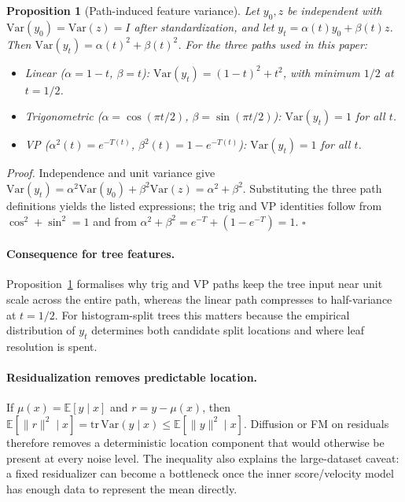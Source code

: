 \documentclass{tpm2026}
\newcommand{\E}{\mathbb{E}}
\newcommand{\Var}{\mathrm{Var}}
\newtheorem{proposition}{Proposition}
\begin{document}
\begin{proposition}[Path-induced feature variance]\label{prop:path-variance}
Let $y_0,z$ be independent with $\Var(y_0)=\Var(z)=I$ after standardization, and let $y_t=\alpha(t)y_0+\beta(t)z$. Then $\Var(y_t)=\alpha(t)^2+\beta(t)^2$. For the three paths used in this paper:
\begin{itemize}
  \item Linear ($\alpha=1-t$, $\beta=t$): $\Var(y_t)=(1-t)^2+t^2$, with minimum $1/2$ at $t=1/2$.
  \item Trigonometric ($\alpha=\cos(\pi t/2)$, $\beta=\sin(\pi t/2)$): $\Var(y_t)=1$ for all $t$.
  \item VP ($\alpha^2(t)=e^{-T(t)}$, $\beta^2(t)=1-e^{-T(t)}$): $\Var(y_t)=1$ for all $t$.
\end{itemize}
\end{proposition}
\emph{Proof.} Independence and unit variance give $\Var(y_t)=\alpha^2\Var(y_0)+\beta^2\Var(z)=\alpha^2+\beta^2$. Substituting the three path definitions yields the listed expressions; the trig and VP identities follow from $\cos^2+\sin^2=1$ and from $\alpha^2+\beta^2=e^{-T}+(1-e^{-T})=1$. \hfill$\square$

\paragraph{Consequence for tree features.} Proposition~\ref{prop:path-variance} formalises why trig and VP paths keep the tree input near unit scale across the entire path, whereas the linear path compresses to half-variance at $t=1/2$. For histogram-split trees this matters because the empirical distribution of $y_t$ determines both candidate split locations and where leaf resolution is spent.

\paragraph{Residualization removes predictable location.} If $\mu(x)=\E[y\mid x]$ and $r=y-\mu(x)$, then $\E[\|r\|^2\mid x]=\mathrm{tr}\,\Var(y\mid x)\leq \E[\|y\|^2\mid x]$. Diffusion or FM on residuals therefore removes a deterministic location component that would otherwise be present at every noise level. The inequality also explains the large-dataset caveat: a fixed residualizer can become a bottleneck once the inner score/velocity model has enough data to represent the mean directly.
\end{document}

